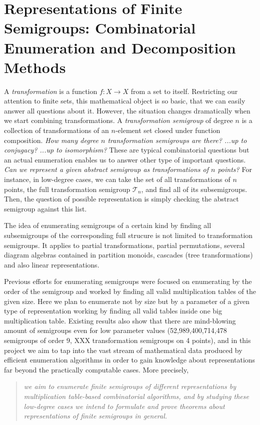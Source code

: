 \documentclass{amsart}
\newcommand{\T}{\mathcal T}
\begin{document}
\section*{Representations of Finite Semigroups: Combinatorial Enumeration and Decomposition Methods}

A \emph{transformation} is a function $f:X\rightarrow X$ from a set to itself.
Restricting our attention to finite sets, this mathematical object is so basic, that we can easily answer all questions about it.
However, the situation changes dramatically when we start combining transformations.
A \emph{transformation semigroup} of degree $n$ is a collection of transformations of an $n$-element set closed under function composition.
\emph{How many degree $n$ transformation semigroups are there? ...up to conjugacy? ...up to isomorphism?}
These are typical combinatorial questions but an actual enumeration enables us to answer other type of important questions.
\emph{Can we represent a given abstract semigroup as transformations of $n$ points?}
For instance, in low-degree cases,  we can take the set of all transformations of $n$ points, the full transformation semigroup $\T_n$, and find all of its subsemigroups.
Then, the question of possible representation is simply checking the abstract semigroup against this list.

The idea of enumerating semigroups of a certain kind by finding all subsemigroups of the corresponding full strucure is not limited to transformation semigroups.
It applies to partial transformations, partial permutations, several diagram algebras contained in partition monoids, cascades (tree transformations) and also linear representations.  

Previous efforts for enumerating semigroups were focused on enumerating by the order of the semigroup and worked by finding all valid multiplication tables of the given size.
Here we plan to enumerate not by size but by a parameter of a given type of representation working by finding all valid tables inside one big multiplication table.
Existing results also show that there are mind-blowing amount of semigroups even for low parameter values (52,989,400,714,478 semigroups of order 9, XXX transformation semigroups on 4 points), and in this project we aim to tap into the vast stream of mathematical data produced by efficient enumeration algorithms in order to gain knowledge about representations far beyond the practically computable cases.
More precisely,
\begin{quote}
\noindent\emph{we aim to enumerate finite semigroups of different representations by multiplication table-based combinatorial algorithms, and by studying these low-degree cases we intend to formulate and prove theorems about representations of finite semigroups in general.}
\end{quote}
\end{document}
